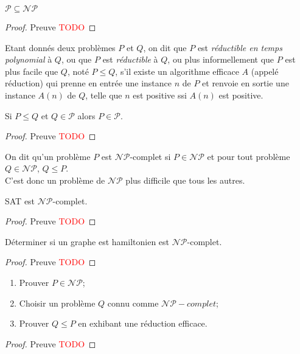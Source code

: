 \begin{mycorr}
  $\mathcal{P} \subseteq \mathcal{NP}$
  \begin{proof}
     Preuve \textcolor{red}{TODO}
  \end{proof}
\end{mycorr}

\begin{mydef}
  Etant donnés deux problèmes $P$ et $Q$, on dit que $P$ est \emph{réductible en temps polynomial} à $Q$, ou que $P$ est \emph{réductible} à $Q$, ou plus informellement que $P$ est plus facile que $Q$, noté $P \leq Q$, s’il existe un algorithme efficace $A$ (appelé réduction) qui prenne en entrée une instance $n$ de $P$ et renvoie en sortie une instance $A(n)$ de $Q$, telle que $n$ est positive ssi $A(n)$ est positive.
\end{mydef}

\begin{mytheo}
  Si $P \leq Q$ et $Q \in \mathcal{P}$ alors $P \in \mathcal{P}$.
  \begin{proof}
     Preuve \textcolor{red}{TODO}
  \end{proof}
\end{mytheo}

\begin{mydef}
  On dit qu'un problème $P$ est $\mathcal{NP}$-complet si $P \in \mathcal{NP}$ et pour tout problème $Q \in \mathcal{NP}$, $Q \leq P$.\\
  C'est donc un problème de $\mathcal{NP}$ plus difficile que tous les autres.
\end{mydef}

\begin{mytheo} [Cook]
  SAT est $\mathcal{NP}$-complet.
  \begin{proof}
     Preuve \textcolor{red}{TODO}
  \end{proof}
\end{mytheo}

\begin{mytheo} [Karp]
  Déterminer si un graphe est hamiltonien est $\mathcal{NP}$-complet.
  \begin{proof}
     Preuve \textcolor{red}{TODO}
  \end{proof}
\end{mytheo}

\begin{mytheo} 
  \begin{enumerate}
    \item Prouver $P \in \mathcal{NP}$;
    \item Choisir un problème $Q$ connu comme $\mathcal{NP}-complet$;
    \item Prouver $Q \leq P$ en exhibant une réduction efficace.
  \end{enumerate}
  \begin{proof}
     Preuve \textcolor{red}{TODO}
  \end{proof}
\end{mytheo}

